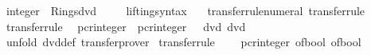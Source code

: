 \begin{isabellebody}
%
\endisadelimproof
\isanewline
\isanewline
{}\isamarkupfalse%
\isanewline
\isanewline
{}\isamarkupfalse%
\ integer\ {\isacharcolon}{\kern0pt}{\isacharcolon}{\kern0pt}\ Rings{\isachardot}{\kern0pt}dvd%
\isadelimproof
\ %
\endisadelimproof
%
\isatagproof
\isacommand{{\isachardot}{\kern0pt}{\isachardot}{\kern0pt}}\isamarkupfalse%
%
\endisatagproof
{\isafoldproof}%
%
\isadelimproof
%
\endisadelimproof
\isanewline
\isanewline
{}\isamarkupfalse%
\isanewline
\ \ \ lifting{\isacharunderscore}{\kern0pt}syntax\isanewline
\ \ \ transfer{\isacharunderscore}{\kern0pt}rule{\isacharunderscore}{\kern0pt}numeral\ {\isacharbrackleft}{\kern0pt}transfer{\isacharunderscore}{\kern0pt}rule{\isacharbrackright}{\kern0pt}\isanewline
{}\isanewline
\isanewline
{}\isamarkupfalse%
\ {\isacharbrackleft}{\kern0pt}transfer{\isacharunderscore}{\kern0pt}rule{\isacharbrackright}{\kern0pt}{\isacharcolon}{\kern0pt}\isanewline
\ \ {\isachardoublequoteopen}{\isacharparenleft}{\kern0pt}pcr{\isacharunderscore}{\kern0pt}integer\ {\isacharequal}{\kern0pt}{\isacharequal}{\kern0pt}{\isacharequal}{\kern0pt}{\isachargreater}{\kern0pt}\ pcr{\isacharunderscore}{\kern0pt}integer\ {\isacharequal}{\kern0pt}{\isacharequal}{\kern0pt}{\isacharequal}{\kern0pt}{\isachargreater}{\kern0pt}\ {\isacharparenleft}{\kern0pt}{\isasymlongleftrightarrow}{\isacharparenright}{\kern0pt}{\isacharparenright}{\kern0pt}\ {\isacharparenleft}{\kern0pt}dvd{\isacharparenright}{\kern0pt}\ {\isacharparenleft}{\kern0pt}dvd{\isacharparenright}{\kern0pt}{\isachardoublequoteclose}\isanewline
%
\isadelimproof
\ \ %
\endisadelimproof
%
\isatagproof
{}\isamarkupfalse%
\ {\isacharparenleft}{\kern0pt}unfold\ dvd{\isacharunderscore}{\kern0pt}def{\isacharparenright}{\kern0pt}\ transfer{\isacharunderscore}{\kern0pt}prover%
\endisatagproof
{\isafoldproof}%
%
\isadelimproof
\isanewline
%
\endisadelimproof
\isanewline
{}\isamarkupfalse%
\ {\isacharbrackleft}{\kern0pt}transfer{\isacharunderscore}{\kern0pt}rule{\isacharbrackright}{\kern0pt}{\isacharcolon}{\kern0pt}\isanewline
\ \ {\isachardoublequoteopen}{\isacharparenleft}{\kern0pt}{\isacharparenleft}{\kern0pt}{\isasymlongleftrightarrow}{\isacharparenright}{\kern0pt}\ {\isacharequal}{\kern0pt}{\isacharequal}{\kern0pt}{\isacharequal}{\kern0pt}{\isachargreater}{\kern0pt}\ pcr{\isacharunderscore}{\kern0pt}integer{\isacharparenright}{\kern0pt}\ of{\isacharunderscore}{\kern0pt}bool\ of{\isacharunderscore}{\kern0pt}bool{\isachardoublequoteclose}\isanewline

\end{isabellebody}
